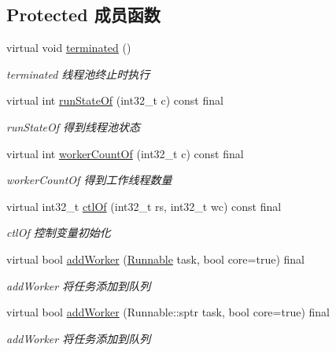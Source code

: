 \subsection*{Protected 成员函数}
\begin{DoxyCompactItemize}
\item 
\mbox{\label{classThreadPoolExecutor_a61774315237123faf8e7fcc9d35ae47d}} 
virtual void \hyperlink{classThreadPoolExecutor_a61774315237123faf8e7fcc9d35ae47d}{terminated} ()
\begin{DoxyCompactList}\small\item\em terminated 线程池终止时执行 \end{DoxyCompactList}\item 
virtual int \hyperlink{classThreadPoolExecutor_acdb626fdcb6ed4c7822508d1e0a3fcf5}{run\+State\+Of} (int32\+\_\+t c) const final
\begin{DoxyCompactList}\small\item\em run\+State\+Of 得到线程池状态 \end{DoxyCompactList}\item 
virtual int \hyperlink{classThreadPoolExecutor_a4f842d070a584bbc16a693207a947aac}{worker\+Count\+Of} (int32\+\_\+t c) const final
\begin{DoxyCompactList}\small\item\em worker\+Count\+Of 得到工作线程数量 \end{DoxyCompactList}\item 
virtual int32\+\_\+t \hyperlink{classThreadPoolExecutor_a31ed7a73571c79c8dbb486f27a4df4eb}{ctl\+Of} (int32\+\_\+t rs, int32\+\_\+t wc) const final
\begin{DoxyCompactList}\small\item\em ctl\+Of 控制变量初始化 \end{DoxyCompactList}\item 
virtual bool \hyperlink{classThreadPoolExecutor_aec8e7c250025db138cde555d759c8194}{add\+Worker} (\hyperlink{classRunnable}{Runnable} task, bool core=true) final
\begin{DoxyCompactList}\small\item\em add\+Worker 将任务添加到队列 \end{DoxyCompactList}\item 
virtual bool \hyperlink{classThreadPoolExecutor_ac2615dd9c245049110104603289beb54}{add\+Worker} (Runnable\+::sptr task, bool core=true) final
\begin{DoxyCompactList}\small\item\em add\+Worker 将任务添加到队列 \end{DoxyCompactList}\item 

\end{DoxyCompactItemize}
